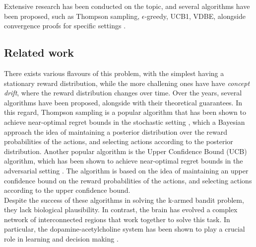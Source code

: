 Extensive research has been conducted on the topic, and several algorithms have been proposed, such as Thompson sampling, $\epsilon$-greedy, UCB1, VDBE, alongside convergence proofs for specific settings \cite{gittinsBanditProcessesDynamic1979, kaufmannThompsonSamplingAsymptotically2012, banMultifacetContextualBandits2021, tokicAdaptiveEGreedyExploration2010, tokicValueDifferenceBasedExploration2011}.

\subsection{Related work}
There exists various flavours of this problem, with the simplest having a stationary reward distribution, while the more challening ones have have \textit{concept drift}, where the reward distribution changes over time.
Over the years, several algorithms have been proposed, alongside with their theoretical guarantees. In this regard, Thompson sampling is a popular algorithm that has been shown to achieve near-optimal regret bounds in the stochastic setting \cite{agrawalAnalysisThompsonSampling2012}, which 
a Bayesian approach  the idea of maintaining a posterior distribution over the reward probabilities of the actions, and selecting actions according to the posterior distribution. Another popular algorithm is the Upper Confidence Bound (UCB) algorithm, which has been shown to achieve near-optimal
regret bounds in the adversarial setting \cite{auerFinitetimeAnalysisMultiarmed2002}. The algorithm is based on the idea of maintaining an upper confidence bound on the reward probabilities of the actions, and selecting actions according to the upper confidence bound.
\\
Despite the success of these algorithms in solving the k-armed bandit problem, they lack biological plausibility. In contrast, the brain has evolved a complex network of interconnected regions that work together to solve this task. In particular, the dopamine-acetylcholine system has been shown to
play a crucial role in learning and decision making \cite{dayanDecisionTheoryReinforcement2008}.

